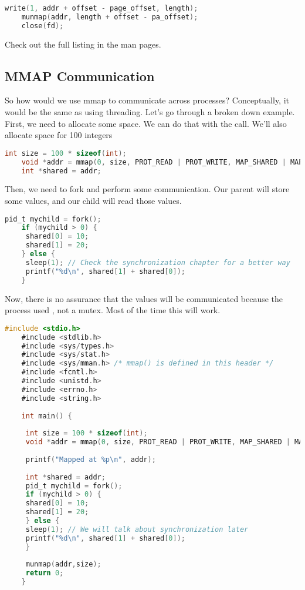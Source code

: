 \begin{lstlisting}[language=C]
	write(1, addr + offset - page_offset, length);
	munmap(addr, length + offset - pa_offset);
	close(fd);
\end{lstlisting}
	 
Check out the full listing in the man pages.
	 
\subsection{MMAP Communication}
	 
So how would we use mmap to communicate across processes?
Conceptually, it would be the same as using threading.
Let's go through a broken down example.
First, we need to allocate some space.
We can do that with the  call.
We'll also allocate space for 100 integers
	 
\begin{lstlisting}[language=C]
	int size = 100 * sizeof(int);
	void *addr = mmap(0, size, PROT_READ | PROT_WRITE, MAP_SHARED | MAP_ANONYMOUS, -1, 0);
	int *shared = addr;
\end{lstlisting}
	 
Then, we need to fork and perform some communication.
Our parent will store some values, and our child will read those values.
	 
\begin{lstlisting}[language=C]
	pid_t mychild = fork();
	if (mychild > 0) {
	 shared[0] = 10;
	 shared[1] = 20;
	} else {
	 sleep(1); // Check the synchronization chapter for a better way
	 printf("%d\n", shared[1] + shared[0]);
	}
\end{lstlisting}
	 
Now, there is no assurance that the values will be communicated because the process used , not a mutex.
Most of the time this will work.
	 
\begin{lstlisting}[language=C]
	#include <stdio.h>
	#include <stdlib.h>
	#include <sys/types.h>
	#include <sys/stat.h>
	#include <sys/mman.h> /* mmap() is defined in this header */
	#include <fcntl.h>
	#include <unistd.h>
	#include <errno.h>
	#include <string.h>
	 
	int main() {
	 
	 int size = 100 * sizeof(int);
	 void *addr = mmap(0, size, PROT_READ | PROT_WRITE, MAP_SHARED | MAP_ANONYMOUS, -1, 0);
	 
	 printf("Mapped at %p\n", addr);
	 
	 int *shared = addr;
	 pid_t mychild = fork();
	 if (mychild > 0) {
	 shared[0] = 10;
	 shared[1] = 20;
	 } else {
	 sleep(1); // We will talk about synchronization later
	 printf("%d\n", shared[1] + shared[0]);
	 }
	 
	 munmap(addr,size);
	 return 0;
	}
\end{lstlisting}
	 
